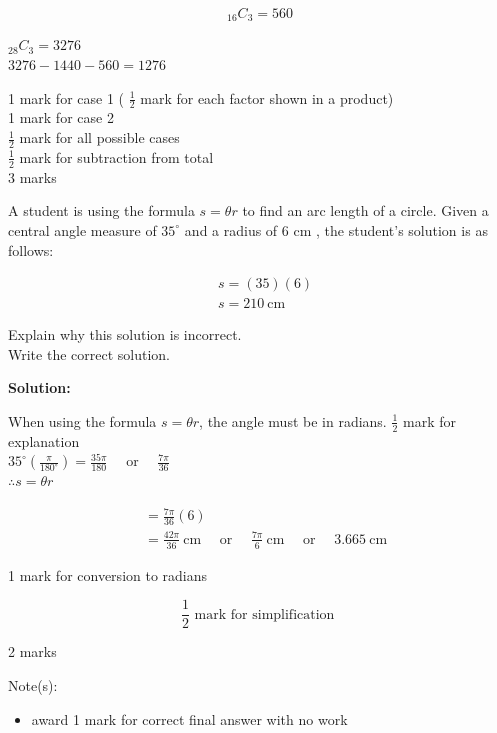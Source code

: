 \documentclass[12pt,addpoints,answers]{exam}
\begin{document}
\begin{questions}
\begin{solution}
$$
{ }_{16} C_{3}=560
$$

${ }_{28} C_{3}=3276$\\
$3276-1440-560=1276$

1 mark for case 1 ( $\frac{1}{2}$ mark for each factor shown in a product)\\
1 mark for case 2\\
$\frac{1}{2}$ mark for all possible cases\\
$\frac{1}{2}$ mark for subtraction from total\\
3 marks
\end{solution}

\question
\leavevmode
A student is using the formula $s=\theta r$ to find an arc length of a circle. Given a central angle measure of $35^{\circ}$ and a radius of 6 cm , the student's solution is as follows:

$$
\begin{aligned}
& s=(35)(6) \\
& s=210 \mathrm{~cm}
\end{aligned}
$$

Explain why this solution is incorrect.\\
Write the correct solution.
\begin{solution}
\textbf{Solution:}\par
When using the formula $s=\theta r$, the angle must be in radians. $\frac{1}{2}$ mark for explanation\\
$35^{\circ}\left(\frac{\pi}{180^{\circ}}\right)=\frac{35 \pi}{180} \quad$ or $\quad \frac{7 \pi}{36}$\\
$\therefore s=\theta r$

$$
\begin{aligned}
& =\frac{7 \pi}{36}(6) \\
& =\frac{42 \pi}{36} \mathrm{~cm} \quad \text { or } \quad \frac{7 \pi}{6} \mathrm{~cm} \quad \text { or } \quad 3.665 \mathrm{~cm}
\end{aligned}
$$

1 mark for conversion to radians

$$
\frac{1}{2} \text { mark for simplification }
$$

2 marks

Note(s):

\begin{itemize}
  \item award 1 mark for correct final answer with no work
\end{itemize}
\end{solution}


\end{questions}
\end{document}
